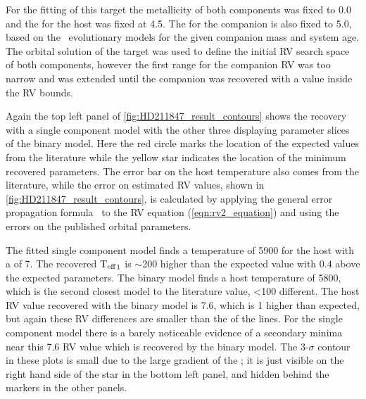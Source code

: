 For the fitting of this target the metallicity of both components was fixed to 0.0 and the \Logg{} for the host was fixed at 4.5.
The \Logg{} for the companion is also fixed to 5.0, based on the~\citet{baraffe_new_2015} evolutionary models for the given companion mass and system age.
The orbital solution of the target was used to define the initial {RV} search space of both components, however the first range for the companion {RV} was too narrow and was extended until the companion was recovered with a value inside the {RV} bounds.

Again the top left panel of \cref{fig:HD211847_result_contours} shows the recovery with a single component model with the other three displaying parameter slices of the binary model.
Here the red circle marks the location of the expected values from the literature while the yellow star indicates the location of the minimum \textchisquared{} recovered parameters.
The error bar on the host temperature also comes from the literature, while the error on estimated {RV} values, shown in \cref{fig:HD211847_result_contours}, is calculated by applying the general error propagation formula~\citep{ku_notes_1966} to the {RV} equation (\cref{eqn:rv2_equation}) and using the errors on the published orbital parameters.

The fitted single component model finds a temperature of 5900\K{} for the host with a \Rvone{} of 7\kmps{}.
The recovered \({\textrm{T}_{\mathrm{eff}}}_{1}\) is \(\sim\)200\K{} higher than the expected value with \Rvone{} 0.4\kmps{}  above the expected parameters.
The binary model finds a host temperature of 5800\K{}, which is the second closest model to the literature value, <100\K{} different.
The host {RV} value recovered with the binary model is 7.6\kmps{}, which is 1\kmps{} higher than expected, but again these {RV} differences are smaller than the {\fwhm} of the lines.
For the single component model there is a barely noticeable evidence of a secondary minima near this 7.6\kmps{} {RV} value which is recovered by the binary model.
The 3-\(\sigma\) contour in these plots is small due to the large gradient of the \textchisquared{}; it is just visible on the right hand side of the star in the bottom left panel, and hidden behind the markers in the other panels.

